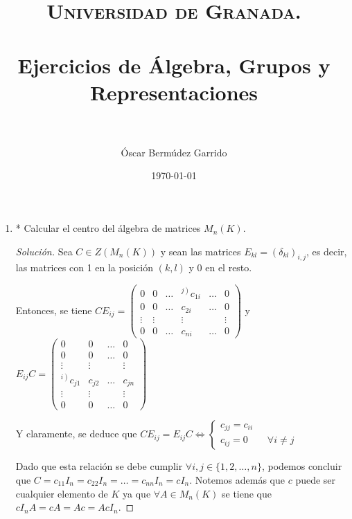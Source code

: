 \documentclass[paper=a4, fontsize=11pt, spanish]{scrartcl}
\title{
  \normalfont \normalsize 
  \textsc{Universidad de Granada.} \\ [25pt] %
  \horrule{0.5pt} \\[0.4cm] %
  \huge Ejercicios de Álgebra, Grupos y Representaciones \\ %
  \horrule{2pt} \\[0.5cm] %
}
\author{Óscar Bermúdez Garrido} %
\date{\normalsize\today} %
\begin{document}
	\maketitle %
	
	\newpage

	\begin{enumerate}
		\item * Calcular el centro del álgebra de matrices $M_n(K)$.
		\begin{proof}[Solución]
			Sea $C \in Z(M_n(K))$ y sean las matrices $E_{kl} = (\delta_{kl})_{i,j}$, es decir, las matrices con
			1 en la posición $(k, l)$ y 0 en el resto.
			
			Entonces, se tiene $CE_{ij} =
			\begin{pmatrix}
				   0   &    0   & \dots  & {}^{\left.j\right)}c_{1i} & \dots  &    0   \\
				   0   &    0   & \dots  &           c_{2i}          & \dots  &    0   \\
				\vdots & \vdots &        &           \vdots          &        & \vdots \\
				   0   &    0   & \dots  &           c_{ni}          & \dots  &    0
			\end{pmatrix}$
			y $E_{ij}C =
			\begin{pmatrix}
				             0            &    0   & \dots  &    0   \\
				             0            &    0   & \dots  &    0   \\
				          \vdots          & \vdots &        & \vdots \\
				{}^{\left.i\right)}c_{j1} & c_{j2} & \dots  & c_{jn} \\
				          \vdots          & \vdots &        & \vdots \\
				             0            &    0   & \dots  &    0
			\end{pmatrix}$
			
			Y claramente, se deduce que $CE_{ij} = E_{ij}C \Leftrightarrow
			\begin{cases}
				c_{jj} = c_{ii} \\
				c_{ij} = 0 \qquad \forall i \neq j
			\end{cases}$
			
			Dado que esta relación se debe cumplir $\forall i,j \in \{1, 2, \dots, n\}$, podemos concluir que
			$C = c_{11}I_n = c_{22}I_n = \dots = c_{nn}I_n = cI_n$. Notemos además que $c$ puede ser cualquier
			elemento de $K$ ya que $\forall A \in M_n(K)$ se tiene que $cI_nA = cA = Ac = AcI_n$.
			

\end{proof}
\end{enumerate}
\end{document}
